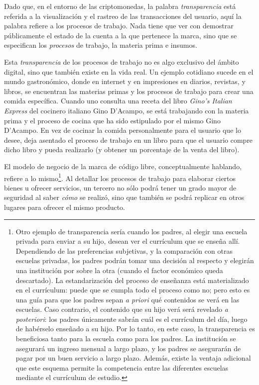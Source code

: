 \documentclass[12pt,a4paper]{article}
\begin{document}
Dado que, en el entorno de las criptomonedas, la palabra \textit{transparencia} está referida a la visualización y el rastreo de las transacciones del usuario, aquí la palabra refiere a los procesos de trabajo. Nada tiene que ver con demostrar públicamente el estado de la cuenta a la que pertenece la marca, sino que se especifican los \textit{procesos} de trabajo, la materia prima e insumos.

Esta \textit{transparencia} de los procesos de trabajo no es algo exclusivo del ámbito digital, sino que también existe en la vida real. Un ejemplo cotidiano sucede en el mundo gastronómico, donde en internet y en impresiones en diarios, revistas, y libros, se encuentran las materias primas y los procesos de trabajo para crear una comida específica. Cuando uno consulta una receta del libro \textit{Gino's Italian Express} del cocinero italiano Gino D'Acampo, se está trabajando con la materia prima y el proceso de cocina que ha sido estipulado por el mismo Gino D'Acampo. En vez de cocinar la comida personalmente para el usuario que lo desee, deja asentado el proceso de trabajo en un libro para que el usuario compre dicho libro y pueda realizarlo (y obtener un porcentaje de la venta del libro). 

El modelo de negocio de la marca de código libre, conceptualmente hablando, refiere a lo mismo\footnote{Otro ejemplo de transparencia sería cuando los padres, al elegir una escuela privada para enviar a su hijo, desean ver el currículum que se enseña allí. Dependiendo de las preferencias subjetivas, y la comparación con otras escuelas privadas, los padres podrán tomar una decisión al respecto y elegirán una institución por sobre la otra (cuando el factor económico queda descartado). La estandarización del proceso de enseñanza está materializado en el currículum: puede que se cumpla todo el proceso como no; pero esto es una guía para que los padres sepan \textit{a priori} qué contenidos se verá en las escuelas. Caso contrario, el contenido que su hijo verá será revelado \textit{a posteriori}: los padres únicamente sabrán cuál es el currículum del día, luego de habérselo enseñado a su hijo. Por lo tanto, en este caso, la transparencia es beneficiosa tanto para la escuela como para los padres. La institución se asegurará un ingreso mensual a largo plazo, y los padres se asegurarán de pagar por un buen servicio a largo plazo. Además, existe la ventaja adicional que este esquema permite la competencia entre las diferentes escuelas mediante el currículum de estudio.}. Al detallar los procesos de trabajo para elaborar ciertos bienes u ofrecer servicios, un tercero no sólo podrá tener un grado mayor de seguridad al saber \textit{cómo} se realizó, sino que también se podrá replicar en otros lugares para ofrecer el mismo producto.
\end{document}
